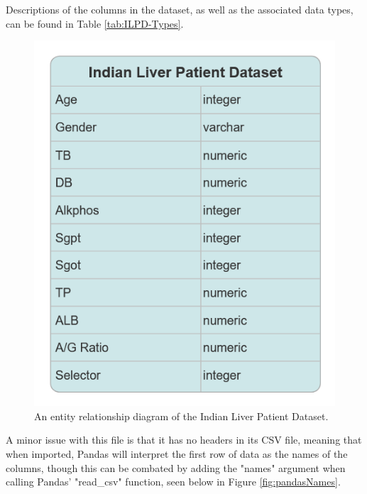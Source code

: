 \documentclass[12pt]{report}
\begin{document}
Descriptions of the columns in the dataset, as well as the associated data types, can be found in Table \ref{tab:ILPD-Types}.

\begin{figure}[H]
    \centering
    \includegraphics[width=.75\linewidth]{ILPD-ERD.png}
    \caption{An entity relationship diagram of the Indian Liver Patient Dataset.}
    \label{fig:ILPD-ERD}
\end{figure}


A minor issue with this file is that it has no headers in its CSV file, meaning that when imported, Pandas will interpret the first 
row of data as the names of the columns, though this can be combated by adding the "names" argument when calling Pandas' "read\_csv" function,
seen below in Figure \ref{fig:pandasNames}. 
\end{document}
